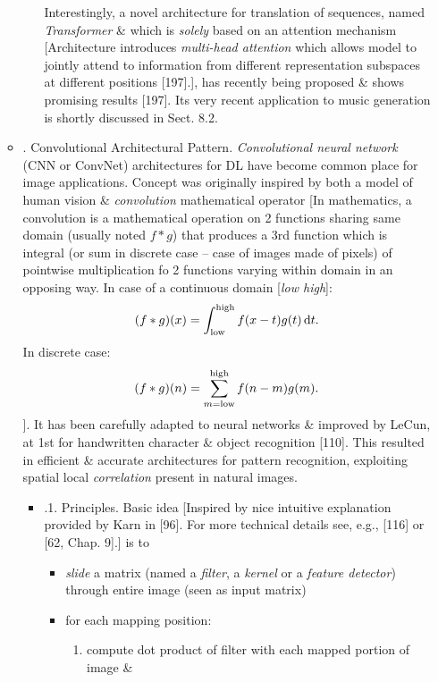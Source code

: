 \documentclass{article}
\begin{document}
\begin{itemize}
\begin{itemize}
\begin{itemize}
			Interestingly, a novel architecture for translation of sequences, named {\it Transformer} \& which is {\it solely} based on an attention mechanism [Architecture introduces {\it multi-head attention} which allows model to jointly attend to information from different representation subspaces at different positions [197].], has recently being proposed \& shows promising results [197]. Its very recent application to music generation is shortly discussed in Sect. 8.2.
		\end{itemize}
		\item {. Convolutional Architectural Pattern.} {\it Convolutional neural network} (CNN or ConvNet) architectures for DL have become common place for image applications. Concept was originally inspired by both a model of human vision \& {\it convolution} mathematical operator [In mathematics, a convolution is a mathematical operation on 2 functions sharing same domain (usually noted $f*g$) that produces a 3rd function which is integral (or sum in discrete case -- case of images made of pixels) of pointwise multiplication fo 2 functions varying within domain in an opposing way. In case of a continuous domain [{\it low high}]:
		\begin{equation*}
			(f*g)(x) = \int_{\rm low}^{\rm high} f(x - t)g(t)\,{\rm d}t.
		\end{equation*}
		In discrete case:
		\begin{equation*}
			(f*g)(n) = \sum_{m = {\rm low}}^{\rm high} f(n - m)g(m).
		\end{equation*}
		]. It has been carefully adapted to neural networks \& improved by {\sc LeCun}, at 1st for handwritten character \& object recognition [110]. This resulted in efficient \& accurate architectures for pattern recognition, exploiting spatial local {\it correlation} present in natural images.
		\begin{itemize}
			\item {.1. Principles.} Basic idea [Inspired by nice intuitive explanation provided by {\sc Karn} in [96]. For more technical details see, e.g., [116] or [62, Chap. 9].] is to
			\begin{itemize}
				\item {\it slide} a matrix (named a {\it filter}, a {\it kernel} or a {\it feature detector}) through entire image (seen as input matrix)
				\item for each mapping position:
				\begin{enumerate}
					\item compute dot product of filter with each mapped portion of image \&

\end{enumerate}
\end{itemize}
\end{itemize}
\end{itemize}
\end{itemize}
\end{document}
